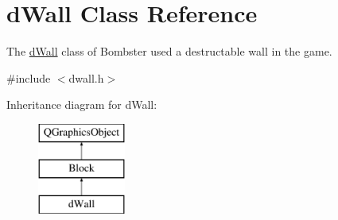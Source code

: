 \hypertarget{classd_wall}{\section{d\-Wall Class Reference}
\label{classd_wall}
}


The \hyperlink{classd_wall}{d\-Wall} class of Bombster used a destructable wall in the game.  




{\ttfamily \#include $<$dwall.\-h$>$}

Inheritance diagram for d\-Wall\-:\begin{figure}[H]
\begin{center}
\leavevmode
\includegraphics[height=3.000000cm]{classd_wall}
\end{center}
\end{figure}
